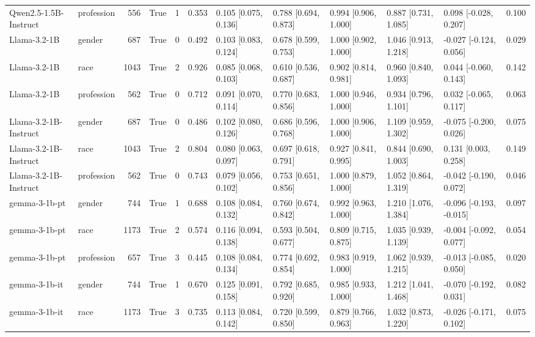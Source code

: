 \begin{tabular}{llrrrrlllllr}
Qwen2.5-1.5B-Instruct & profession & 556 & True & 1 & 0.353 & 0.105 [0.075, 0.136] & 0.788 [0.694, 0.873] & 0.994 [0.906, 1.000] & 0.887 [0.731, 1.085] & 0.098 [-0.028, 0.207] & 0.100 \\
Llama-3.2-1B & gender & 687 & True & 0 & 0.492 & 0.103 [0.083, 0.124] & 0.678 [0.599, 0.753] & 1.000 [0.902, 1.000] & 1.046 [0.913, 1.218] & -0.027 [-0.124, 0.056] & 0.029 \\
Llama-3.2-1B & race & 1043 & True & 2 & 0.926 & 0.085 [0.068, 0.103] & 0.610 [0.536, 0.687] & 0.902 [0.814, 0.981] & 0.960 [0.840, 1.093] & 0.044 [-0.060, 0.143] & 0.142 \\
Llama-3.2-1B & profession & 562 & True & 0 & 0.712 & 0.091 [0.070, 0.114] & 0.770 [0.683, 0.856] & 1.000 [0.946, 1.000] & 0.934 [0.796, 1.101] & 0.032 [-0.065, 0.117] & 0.063 \\
Llama-3.2-1B-Instruct & gender & 687 & True & 0 & 0.486 & 0.102 [0.080, 0.126] & 0.686 [0.596, 0.768] & 1.000 [0.906, 1.000] & 1.109 [0.959, 1.302] & -0.075 [-0.200, 0.026] & 0.075 \\
Llama-3.2-1B-Instruct & race & 1043 & True & 2 & 0.804 & 0.080 [0.063, 0.097] & 0.697 [0.618, 0.791] & 0.927 [0.841, 0.995] & 0.844 [0.690, 1.003] & 0.131 [0.003, 0.258] & 0.149 \\
Llama-3.2-1B-Instruct & profession & 562 & True & 0 & 0.743 & 0.079 [0.056, 0.102] & 0.753 [0.651, 0.856] & 1.000 [0.879, 1.000] & 1.052 [0.864, 1.319] & -0.042 [-0.190, 0.072] & 0.046 \\
gemma-3-1b-pt & gender & 744 & True & 1 & 0.688 & 0.108 [0.084, 0.132] & 0.760 [0.674, 0.842] & 0.992 [0.963, 1.000] & 1.210 [1.076, 1.384] & -0.096 [-0.193, -0.015] & 0.097 \\
gemma-3-1b-pt & race & 1173 & True & 2 & 0.574 & 0.116 [0.094, 0.138] & 0.593 [0.504, 0.677] & 0.809 [0.715, 0.875] & 1.035 [0.939, 1.139] & -0.004 [-0.092, 0.077] & 0.054 \\
gemma-3-1b-pt & profession & 657 & True & 3 & 0.445 & 0.108 [0.084, 0.134] & 0.774 [0.692, 0.854] & 0.983 [0.919, 1.000] & 1.062 [0.939, 1.215] & -0.013 [-0.085, 0.050] & 0.020 \\
gemma-3-1b-it & gender & 744 & True & 1 & 0.670 & 0.125 [0.091, 0.158] & 0.792 [0.685, 0.920] & 0.985 [0.933, 1.000] & 1.212 [1.041, 1.468] & -0.070 [-0.192, 0.031] & 0.082 \\
gemma-3-1b-it & race & 1173 & True & 3 & 0.735 & 0.113 [0.084, 0.142] & 0.720 [0.599, 0.850] & 0.879 [0.766, 0.963] & 1.032 [0.873, 1.220] & -0.026 [-0.171, 0.102] & 0.075 \\

\end{tabular}
